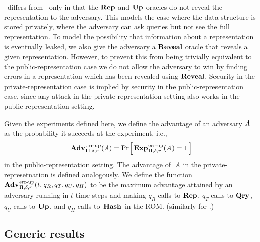 \erreps\ differs from \errep\ only in that the $\textup{\textbf{Rep}}\hspace{0.5pt}$ and $\textup{\textbf{Up}}\hspace{0.5pt}$ oracles do not
reveal the representation to the adversary. This models the case where the data
structure is stored privately, where the adversary can ask queries but not see
the full representation. To model the possibility that information about a
representation is eventually leaked, we also give the adversary a $\mathbf{Reveal}$ oracle
that reveals a given representation. However, to prevent this from being
trivially equivalent to the public-representation case we do not allow the
adversary to win by finding errors in a representation which has been revealed
using $\mathbf{Reveal}$.
%
%
Security in the private-representation case is implied by security in the
public-representation case, since any attack in the private-representation
setting also works in the public-representation setting.
%

Given the experiments defined here, we define the advantage of an adversary
$\mathit{A}$ as the probability it succeeds at the experiment, i.e.,
\[\Adv{\errep}_{\struct,\delta,r}(\advA) = \Prob{\Exp{\errep}_{\struct,\delta,r}(\advA) = 1}\]
in the public-representation setting. The advantage of~$\mathit{A}$ in the
private-represetnation is defined analogously.
%
We define the function
$\Adv{\errep}_{\struct,\delta,r}(t,q_R,q_T,q_U,q_H)$ to be the maximum advantage
attained by an adversary running in $t$ time steps and making $q_R$ calls to
$\textup{\textbf{Rep}}\hspace{0.5pt}$, $q_T$ calls to $\textup{\textbf{Qry}}\hspace{0.5pt}$, $q_U$ calls to $\textup{\textbf{Up}}\hspace{0.5pt}$, and $q_H$ calls
to~$\textup{\textbf{Hash}}\hspace{0.5pt}$ in the ROM. (similarly for \erreps.)


\subsection{Generic results}


